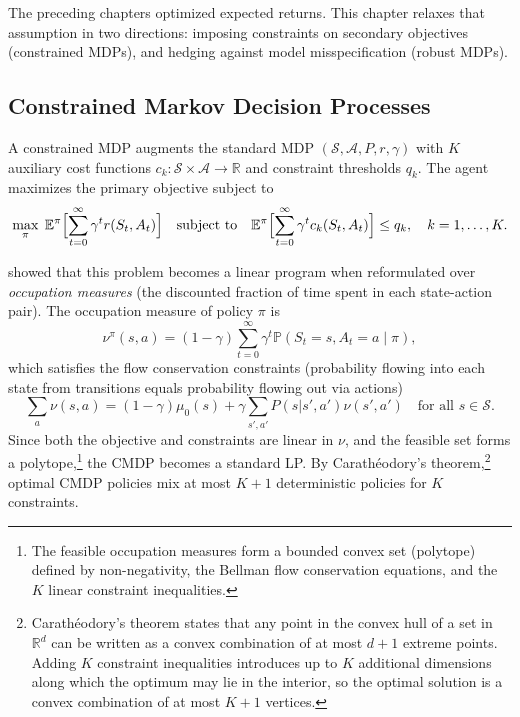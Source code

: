 
The preceding chapters optimized expected returns. This chapter relaxes
that assumption in two directions: imposing constraints on secondary
objectives (constrained MDPs), and hedging against model misspecification
(robust MDPs).


\subsection{Constrained Markov Decision Processes}
\label{subsec:constrained_mdps}

A constrained MDP augments the standard MDP
$(\mathcal{S}, \mathcal{A}, P, r, \gamma)$ with $K$ auxiliary cost
functions $c_k: \mathcal{S} \times \mathcal{A} \to \mathbb{R}$ and
constraint thresholds $q_k$. The agent maximizes the primary objective
subject to
\begin{equation}
  \max_\pi \; \mathbb{E}^\pi\Bigl[\sum_{t=0}^\infty \gamma^t r(S_t, A_t)\Bigr]
  \quad \text{subject to} \quad
  \mathbb{E}^\pi\Bigl[\sum_{t=0}^\infty \gamma^t c_k(S_t, A_t)\Bigr]
  \leq q_k, \quad k = 1, \ldots, K.
  \label{eq:cmdp}
\end{equation}

\citet{Altman1999} showed that this problem becomes a linear
program when reformulated over \emph{occupation measures} (the discounted fraction of
time spent in each state-action pair). The occupation measure of policy
$\pi$ is
\begin{equation}
  \nu^\pi(s,a) = (1-\gamma) \sum_{t=0}^\infty \gamma^t
  \mathbb{P}(S_t = s, A_t = a \mid \pi),
  \label{eq:occupation_measure}
\end{equation}
which satisfies the flow conservation constraints (probability flowing
into each state from transitions equals probability flowing out via
actions)
\begin{equation}
  \sum_a \nu(s,a) = (1-\gamma)\mu_0(s) + \gamma \sum_{s',a'} P(s|s',a')
  \nu(s',a') \quad \text{for all } s \in \mathcal{S}.
  \label{eq:bellman_flow}
\end{equation}
Since both the objective and
constraints are linear in $\nu$, and the feasible set forms a
polytope,\footnote{The feasible occupation measures form a bounded convex
set (polytope) defined by non-negativity, the Bellman flow conservation
equations, and the $K$ linear constraint inequalities.} the CMDP becomes a
standard LP. By Carath\'eodory's theorem,\footnote{Carath\'eodory's theorem
states that any point in the convex hull of a set in $\mathbb{R}^d$ can be
written as a convex combination of at most $d+1$ extreme points. Adding $K$
constraint inequalities introduces up to $K$ additional dimensions along
which the optimum may lie in the interior, so the optimal solution is a
convex combination of at most $K+1$ vertices.}
optimal CMDP policies mix at most $K+1$ deterministic policies for $K$
constraints.

